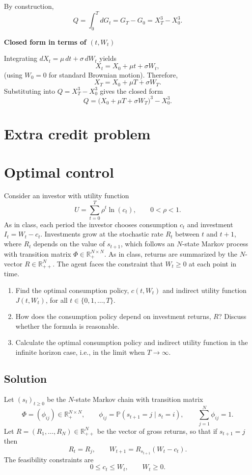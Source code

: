 \documentclass{article}
\begin{document}
By construction,
\[
Q=\int_0^T dG_t = G_T-G_0 = X_T^3 - X_0^3.
\]

\noindent \textbf{ Closed form in terms of \((t,W_t)\)}

Integrating \(dX_t=\mu\,dt+\sigma\,dW_t\) yields
\[
X_t = X_0 + \mu t + \sigma W_t,
\]
(using \(W_0=0\) for standard Brownian motion). Therefore,
\[
X_T = X_0 + \mu T + \sigma W_T.
\]
Substituting into \(Q=X_T^3-X_0^3\) gives the closed form
\[
\boxed{
Q = \big(X_0+\mu T+\sigma W_T\big)^3 - X_0^3.
}
\]


\newpage
\section*{Extra credit problem}


\section{Optimal control}

Consider an investor with utility function
\[
U=\sum_{t=0}^T \rho^t \ln(c_t),
\qquad 0<\rho<1.
\]
As in class, each period the investor chooses consumption $c_t$ and investment $I_t=W_t-c_t$. Investments grow at the stochastic rate $R_t$ between $t$ and $t+1$, where $R_t$ depends on the value of $s_{t+1}$, which follows an $N$-state Markov process with transition matrix $\Phi\in\mathbb{R}_+^{N\times N}$. As in class, returns are summarized by the $N$-vector $R\in\mathbb{R}_{++}^N$. The agent faces the constraint that $W_t\ge 0$ at each point in time.

\begin{enumerate}
\item[(a)] Find the optimal consumption policy, $c(t,W_t)$ and indirect utility function $J(t,W_t)$, for all $t\in\{0,1,\ldots,T\}$.
\item[(b)] How does the consumption policy depend on investment returns, $R$? Discuss whether the formula is reasonable.
\item[(c)] Calculate the optimal consumption policy and indirect utility function in the infinite horizon case, i.e., in the limit when $T\to\infty$.
\end{enumerate}

\bigskip
\bigskip

\subsection*{Solution}

Let $(s_t)_{t\ge 0}$ be the $N$-state Markov chain with transition matrix
\[
\Phi=(\phi_{ij})\in\mathbb{R}_+^{N\times N},
\qquad
\phi_{ij}=\mathbb{P}(s_{t+1}=j\mid s_t=i),
\qquad
\sum_{j=1}^N \phi_{ij}=1.
\]
Let $R=(R_1,\dots,R_N)\in\mathbb{R}_{++}^N$ be the vector of gross returns, so that if $s_{t+1}=j$ then
\[
R_t=R_j,
\qquad
W_{t+1}=R_{s_{t+1}}(W_t-c_t).
\]
The feasibility constraints are
\[
0\le c_t\le W_t,\qquad W_t\ge 0.
\]
\end{document}
